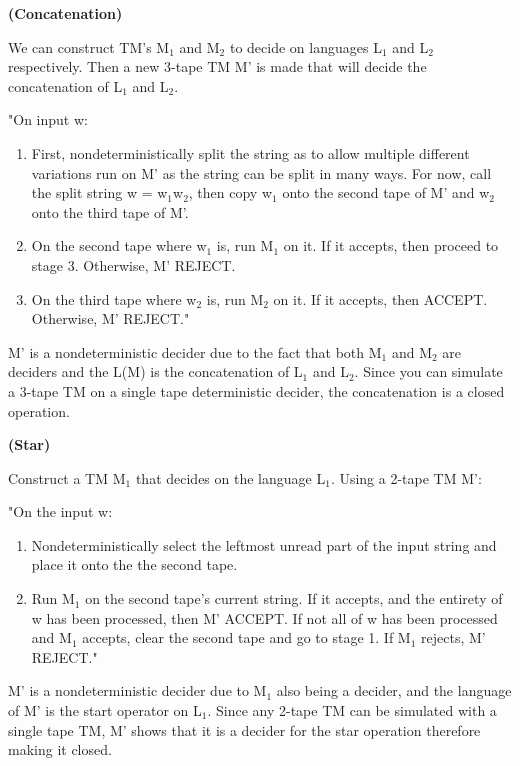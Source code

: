 \documentclass[11pt]{article}
\renewcommand\part[1]{\vspace{.10in}\textbf{(#1)}\par}
\begin{document}
	\part{Concatenation}	
		We can construct TM's M$_{1}$ and M$_{2}$ to decide on languages L$_{1}$ and L$_{2}$ respectively. Then a new 3-tape TM M' is made that will decide the concatenation of L$_{1}$ and L$_{2}$.\par
		"On input w:
		\begin{enumerate}
			\item First, nondeterministically split the string as to allow multiple different variations run on M' as the string can be split in many ways. For now, call the split string w = w$_{1}$w$_{2}$, then copy w$_{1}$ onto the second tape of M' and w$_{2}$ onto the third tape of M'.
			\item On the second tape where w$_{1}$ is, run M$_{1}$ on it. If it accepts, then proceed to stage 3. Otherwise, M' REJECT.
			\item On the third tape where w$_{2}$ is, run M$_{2}$ on it. If it accepts, then ACCEPT. Otherwise, M' REJECT."
		\end{enumerate}
		M' is a nondeterministic decider due to the fact that both M$_{1}$ and M$_{2}$ are deciders and the L(M) is the concatenation of L$_{1}$ and L$_{2}$. Since you can simulate a 3-tape TM on a single tape deterministic decider, the concatenation is a closed operation.
	
		
	\part{Star}
		Construct a TM M$_{1}$ that decides on the language L$_{1}$. Using a 2-tape TM M':\par
		"On the input w:
		\begin{enumerate}
			\item Nondeterministically select the leftmost unread part of the input string and place it onto the the second tape.
			\item Run M$_{1}$ on the second tape's current string. If it accepts, and the entirety of w has been processed, then M' ACCEPT. If not all of w has been processed and M$_{1}$ accepts, clear the second tape and go to stage 1. If M$_{1}$ rejects, M' REJECT."
		\end{enumerate}
		M' is a  nondeterministic decider due to M$_{1}$ also being a decider, and the language of M' is the start operator on L$_{1}$. Since any 2-tape TM can be simulated with a single tape TM, M' shows that it is a decider for the star operation therefore making it closed.
		
\end{document}
